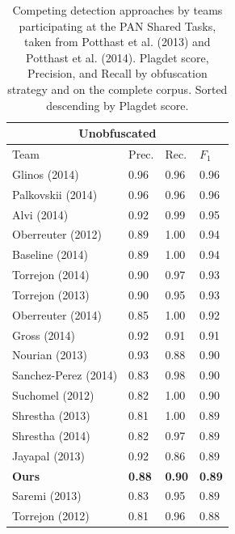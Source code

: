 \begin{table}[th]

\scriptsize
\setlength{\tabcolsep}{4pt}%

\caption{Competing detection approaches by teams participating at the PAN Shared Tasks, taken from Potthast et al. (2013)\cite{potthast:2013} and Potthast et al. (2014)\cite{potthast:2014}. Plagdet score, Precision, and Recall by obfuscation strategy and on the complete corpus. Sorted descending by Plagdet score.}
\label{tab:pan13}
    
\begin{tabularx}{.31\textwidth}{@{}l*{3}{X}}
\multicolumn{4}{c}{\bfseries Unobfuscated} \\
\toprule
Team                & Prec.     & Rec.   & $F_1$   \\
\midrule
Glinos (2014)        &         0.96 &   0.96 &  0.96 \\
Palkovskii (2014)    &         0.96 &   0.96 &  0.96 \\
Alvi (2014)          &         0.92 &   0.99 &  0.95 \\
Oberreuter (2012)    &         0.89 &   1.00 &  0.94 \\
Baseline (2014)      &         0.89 &   1.00 &  0.94 \\
Torrejon (2014)      &         0.90 &   0.97 &  0.93 \\
Torrejon (2013)      &         0.90 &   0.95 &  0.93 \\
Oberreuter (2014)    &         0.85 &   1.00 &  0.92 \\
Gross (2014)         &         0.92 &   0.91 &  0.91 \\
Nourian (2013)       &         0.93 &   0.88 &  0.90 \\
Sanchez-Perez (2014) &         0.83 &   0.98 &  0.90 \\
Suchomel (2012)      &         0.82 &   1.00 &  0.90 \\
Shrestha (2013)      &         0.81 &   1.00 &  0.89 \\
Shrestha (2014)      &         0.82 &   0.97 &  0.89 \\
Jayapal (2013)       &         0.92 &   0.86 &  0.89 \\
\textbf{Ours}          &         \textbf{0.88} &   \textbf{0.90} &  \textbf{0.89} \\
Saremi (2013)        &         0.83 &   0.95 &  0.89 \\
Torrejon (2012)      &         0.81 &   0.96 &  0.88 \\

\end{tabularx}
\end{table}
